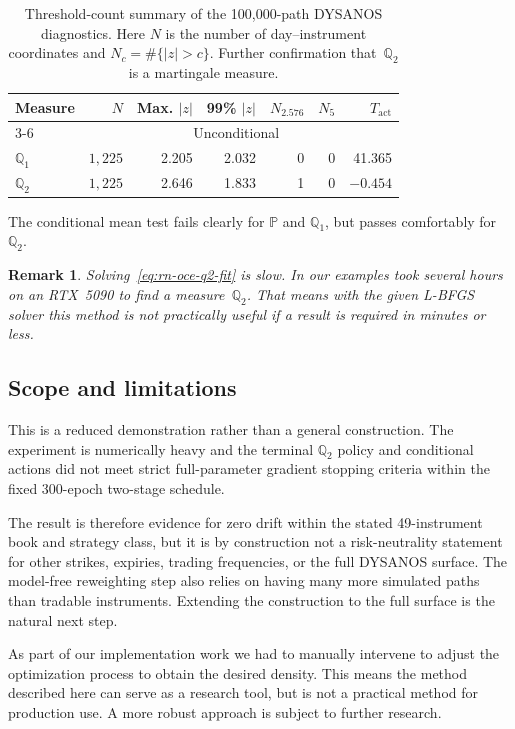 \documentclass[11pt,a4paper]{article}
\newtheorem{remark}[definition]{Remark}
\newcommand{\Q}{\mathbb{Q}}
\renewcommand{\P}{\mathbb{P}}
\renewcommand{\Q}{\mathbb{Q}}
\begin{document}
\begin{table}[H]
\centering
\small
\begin{tabular}{lrrrrrr}
\toprule
Measure & $N$ & Max. $|z|$ & 99\% $|z|$
  & $N_{2.576}$ & $N_5$ & $T_{\mathrm{act}}$\\
\cmidrule(lr){3-6}
 & & \multicolumn{4}{c}{Unconditional} & \\
\midrule
$\Q_1$ & $1{,}225$ & 2.205 & 2.032 & 0 & 0
  & {\color{red}41.365}\\
$\Q_2$ & $1{,}225$ & {\color{orange}2.646} & 1.833 & 1 & 0
  & $-0.454$\\
\bottomrule
\end{tabular}
\caption{Threshold-count summary of the 100,000-path DYSANOS diagnostics.
Here $N$ is the number of day--instrument coordinates and
$N_c=\#\{|z|>c\}$. Further confirmation that~$\Q_2$ is a martingale measure.}
\label{tab:rn-q-threshold-summary}
\end{table}

The conditional mean test fails clearly for $\P$ and $\Q_1$, but passes comfortably for $\Q_2$.

\begin{remark}
	Solving~\eqref{eq:rn-oce-q2-fit} is \emph{slow}. In our examples took several hours on an RTX~5090 to find a measure~$\Q_2$.
	That means with the given L-BFGS solver this method is not practically useful if a result is required in minutes or less.
\end{remark}


\subsection{Scope and limitations}
\label{sec:risk-neutral-scope}

This is a reduced demonstration rather than a general construction.  The
experiment is numerically heavy and the terminal $\Q_2$ policy and conditional
actions did not meet strict full-parameter gradient stopping criteria within
the fixed 300-epoch two-stage schedule.

The result is therefore evidence for zero drift within the stated
49-instrument book and strategy class, but it is by construction not a risk-neutrality statement for
other strikes, expiries, trading frequencies, or the full DYSANOS surface.
The model-free reweighting step also relies on having many more simulated paths
than tradable instruments.  Extending the construction to the full surface is
the natural next step.

As part of our implementation work we had to manually intervene to adjust
the optimization process to obtain the desired density. This means the method described
here can serve as a research tool, but is not a practical method for production use. A more robust
approach is subject to further research.
\end{document}
